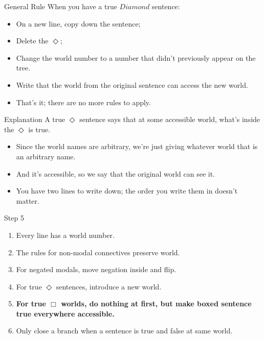 \documentclass[
  14pt,
  letterpaper,
  ignorenonframetext,
  aspectratio=169,
  handout]{beamer}
\providecommand{\tightlist}{%
  \setlength{\itemsep}{0pt}\setlength{\parskip}{0pt}}\usepackage{longtable,booktabs,array}
\begin{document}
\begin{frame}{General Rule}
\protect\hypertarget{general-rule}{}
When you have a true \(Diamond\) sentence:

\begin{itemize}
\tightlist
\item
  On a new line, copy down the sentence;
\item
  Delete the \(\Diamond\);
\item
  Change the world number to a number that didn't previously appear on
  the tree.
\item
  Write that the world from the original sentence can access the new
  world.
\item
  That's it; there are no more rules to apply.
\end{itemize}
\end{frame}

\begin{frame}{Explanation}
\protect\hypertarget{explanation}{}
A true \(\Diamond\) sentence says that at some accessible world, what's
inside the \(\Diamond\) is true.

\begin{itemize}
\tightlist
\item
  Since the world names are arbitrary, we're just giving whatever world
  that is an arbitrary name.
\item
  And it's accessible, so we say that the original world can see it.
\item
  You have two lines to write down; the order you write them in doesn't
  matter.
\end{itemize}
\end{frame}

\begin{frame}{Step 5}
\protect\hypertarget{step-5}{}
\begin{enumerate}
\tightlist
\item
  Every line has a world number.
\item
  The rules for non-modal connectives preserve world.
\item
  For negated modals, move negation inside and flip.
\item
  For true \(\Diamond\) sentences, introduce a new world.
\item
  \textbf{For true \(\Box\) worlds, do nothing at first, but make boxed
  sentence true everywhere accessible.}
\item
  Only close a branch when a sentence is true and false at same world.
\end{enumerate}
\end{frame}
\end{document}
